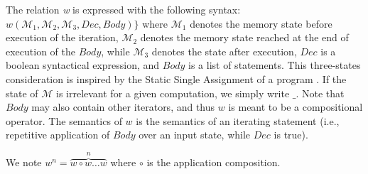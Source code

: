 \documentclass[submission,copyright,creativecommons]{eptcs}
\newcommand{\M}{\mathcal{M}}
\begin{document}
\noindent
The relation {\it w} is expressed with the following syntax:
$w(\M_1,\M_2,\M_3, Dec, Body)\}$ where $\M_1$ denotes the memory state before execution of the iteration, $\M_2$ denotes the memory state reached at the end of execution of the $Body$, while $\M_3$ denotes the state after execution, $Dec$ is a boolean syntactical expression, and $Body$ is a list of statements. This three-states consideration is inspired by the Static Single Assignment of a program \cite{WZ91}. If the state of $\M$ is irrelevant for a given computation, we simply write $\_$. Note that $Body$ may also contain other iterators, and thus $w$ is meant to be a compositional operator. The semantics of $w$ is the semantics of an iterating statement (i.e., repetitive application of $Body$ over an input state, while $Dec$ is true).

\noindent
We note $w^n = \overbrace{w \circ w \ldots w}^n$ where $\circ$ is the application composition.
\end{document}
